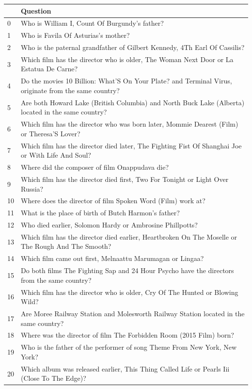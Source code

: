 \begin{tabular}{ll}
\toprule
 & Question \\
\midrule
0 & Who is William I, Count Of Burgundy's father? \\
1 & Who is Favila Of Asturias's mother? \\
2 & Who is the paternal grandfather of Gilbert Kennedy, 4Th Earl Of Cassilis? \\
3 & Which film has the director who is older, The Woman Next Door or La Estatua De Carne? \\
4 & Do the movies 10 Billion: What'S On Your Plate? and Terminal Virus, originate from the same country? \\
5 & Are both Howard Lake (British Columbia) and North Buck Lake (Alberta) located in the same country? \\
6 & Which film has the director who was born later, Mommie Dearest (Film) or Theresa'S Lover? \\
7 & Which film has the director died later, The Fighting Fist Of Shanghai Joe or With Life And Soul? \\
8 & Where did the composer of film Onappudava die? \\
9 & Which film has the director died first, Two For Tonight or Light Over Russia? \\
10 & Where does the director of film Spoken Word (Film) work at? \\
11 & What is the place of birth of Butch Harmon's father? \\
12 & Who died earlier, Solomon Hardy or Ambrosine Phillpotts? \\
13 & Which film has the director died earlier, Heartbroken On The Moselle or The Rough And The Smooth? \\
14 & Which film came out first, Melnaattu Marumagan or Lingaa? \\
15 & Do both films The Fighting Sap and 24 Hour Psycho have the directors from the same country? \\
16 & Which film has the director who is older, Cry Of The Hunted or Blowing Wild? \\
17 & Are Moree Railway Station and Molesworth Railway Station located in the same country? \\
18 & Where was the director of film The Forbidden Room (2015 Film) born? \\
19 & Who is the father of the performer of song Theme From New York, New York? \\
20 & Which album was released earlier, This Thing Called Life or Pearls Iii (Close To The Edge)? \\

\end{tabular}
